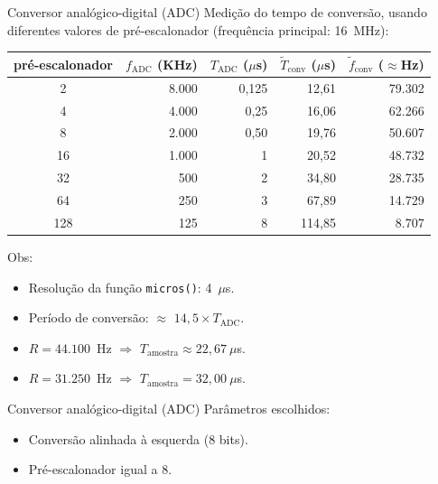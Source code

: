 \begin{frame}{Conversor analógico-digital (ADC)}
Medição do tempo de conversão, usando diferentes valores de pré-escalonador
(frequência principal: 16~MHz):
\begin{center}
\begin{tabular}{crrrr}
\toprule
\toprule
\footnotesize{pré-escalonador} & \footnotesize{$f_\text{ADC}$ (KHz)} &
\footnotesize{$T_\text{ADC}$ ($\mu$s)} & \footnotesize{$\tilde{T}_\text{conv}$ ($\mu$s)} & \footnotesize{$\tilde{f}_\text{conv}$ ($\approx$Hz)} \\
\midrule
2 & 8.000 & 0,125 & 12,61 & 79.302\\
4 & 4.000 & 0,25 & 16,06  & 62.266 \\
\rowcolor{LightCyan}
8 & 2.000 & 0,50 & 19,76  & 50.607 \\
16& 1.000 & 1 & 20,52  & 48.732 \\
32& 500 & 2 & 34,80  & 28.735 \\
64& 250 & 3 & 67,89  & 14.729 \\
128& 125 & 8 & 114,85 & 8.707  \\
\bottomrule
\end{tabular}
\end{center}
Obs:
\begin{itemize}
  \item Resolução da função \texttt{micros()}: 4~$\mu$s.
  \item Período de conversão: $\approx$ $14,5 \times T_\text{ADC}$. 
  \item $R=44.100$~Hz $\Rightarrow$ $T_\text{amostra} \approx 22,67~\mu$s.
  \item $R=31.250$~Hz $\Rightarrow$ $T_\text{amostra} = 32,00~\mu$s.
\end{itemize}
\end{frame}

\begin{frame}{Conversor analógico-digital (ADC)}
Parâmetros escolhidos:
\begin{itemize}
  \item Conversão alinhada à esquerda (8 bits).
  \item Pré-escalonador igual a 8.
\end{itemize}
\end{frame}

